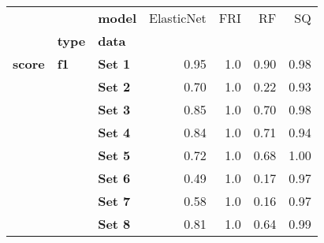 \begin{tabular}{lllrrrr}
\toprule
      &    & \textbf{model} &  ElasticNet &  FRI &    RF &    SQ \\
{} & \textbf{type} & \textbf{data} &             &      &       &       \\
\midrule
\textbf{score} & \textbf{f1} & \textbf{Set 1} &        0.95 &  1.0 &  0.90 &  0.98 \\
      &    & \textbf{Set 2} &        0.70 &  1.0 &  0.22 &  0.93 \\
      &    & \textbf{Set 3} &        0.85 &  1.0 &  0.70 &  0.98 \\
      &    & \textbf{Set 4} &        0.84 &  1.0 &  0.71 &  0.94 \\
      &    & \textbf{Set 5} &        0.72 &  1.0 &  0.68 &  1.00 \\
      &    & \textbf{Set 6} &        0.49 &  1.0 &  0.17 &  0.97 \\
      &    & \textbf{Set 7} &        0.58 &  1.0 &  0.16 &  0.97 \\
      &    & \textbf{Set 8} &        0.81 &  1.0 &  0.64 &  0.99 \\
\bottomrule
\end{tabular}
